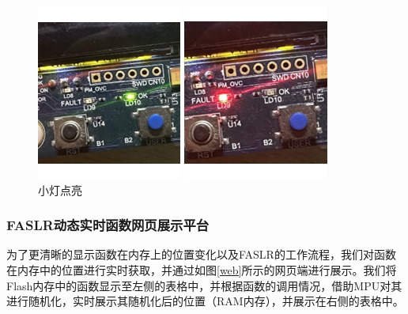 \documentclass[UTF8,12pt,a4paper]{ctexart}
\numberwithin{figure}{section}
\begin{document}
\begin{figure}[htbp]
    \centering
    \begin{minipage}[t]{0.4\textwidth} %
        \centering
        \includegraphics[scale=1]{graph/Light_up1.png}
    \end{minipage}
    \hspace{0.3in} %
    \begin{minipage}[t]{0.4\textwidth}%
        \centering
        \includegraphics[scale=1]{graph/Light_up2.png}
    \end{minipage}
    \caption{小灯点亮}
    \label{LightUp}
\end{figure}

\subsubsection{FASLR动态实时函数网页展示平台}
\par 为了更清晰的显示函数在内存上的位置变化以及FASLR的工作流程，我们对函数在内存中的位置进行实时获取，并通过如图\ref{web}所示的网页端进行展示。我们将Flash内存中的函数显示至左侧的表格中，并根据函数的调用情况，借助MPU对其进行随机化，实时展示其随机化后的位置（RAM内存），并展示在右侧的表格中。
\end{document}

